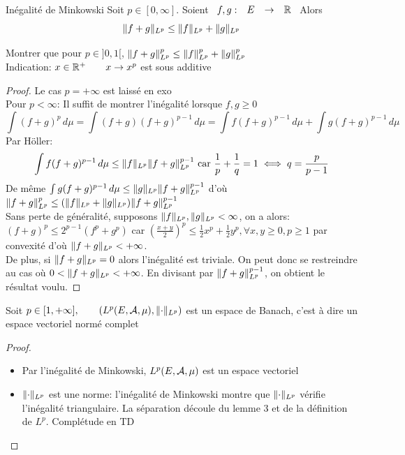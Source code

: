 \documentclass[]{report}
\begin{document}
    \begin{prop}{Inégalité de Minkowski}{}
        Soit $p\in[0,\infty]$. Soient $\begin{array}{ccccc} f,g : & E & \to & \mathbb{R} \end{array}$ Alors
        \[\lVert f+g \rVert_{L^p}\le \lVert f \rVert_{L^p}+\lVert g \rVert_{L^p}\]
    \end{prop}

    \begin{exo}{}{}
        Montrer que pour $p\in]0,1[$, $\lVert f+g \rVert_{L^p}^p\le \lVert f \rVert_{L^p}^p+\lVert g \rVert_{L^p}^p$\\
        Indication: $x\in \mathbb{R}^+\qquad x\to x^p$ est sous additive
    \end{exo}

    \begin{proof}
        Le cas $p=+\infty$ est laissé en exo\\
        Pour $p<\infty$: Il suffit de montrer l'inégalité lorsque $f,g\ge 0$
        \[\int (f+g)^p\,d\mu=\int (f+g)(f+g)^{p-1}\,d\mu=\int f(f+g)^{p-1}\,d\mu+ \int g(f+g)^{p-1}\,d\mu\]
        Par Höller:\[\int f(f+g)^{p-1}\,d\mu\le \lVert f \rVert_{L^p}\lVert f+g \rVert_{L^p}^{p-1}\text{ car }\frac{1}{p}+\frac{1}{q}=1\iff q=\frac{p}{p-1}\]
        De même $\int g(f+g)^{p-1}\,d\mu\le \lVert g \rVert_{L^p}\lVert f+g \rVert_{L^p}^{p-1}$ d'où $\lVert f+g \rVert_{L^p}^p\le (\lVert f \rVert_{L^p}+\lVert g \rVert_{L^p})\lVert f+g \rVert_{L^p}^{p-1}$\\
        Sans perte de généralité, supposons $\lVert f \rVert_{L^p},\lVert g \rVert_{L^p}<\infty$, on a alors: $(f+g)^p\le 2^{p-1}(f^p+g^p)$ car $(\frac{x+y}{2})^p\le \frac{1}{2}x^p+\frac{1}{2}y^p,\forall x,y\ge 0,p\ge 1$ par convexité d'où $\lVert f+g \rVert_{L^p}<+\infty$.\\
        De plus, si $\lVert f+g \rVert_{L^p}=0$ alors l'inégalité est triviale. On peut donc se restreindre au cas où $0<\lVert f+g \rVert_{L^p}<+\infty$. En divisant par $\lVert f+g \rVert_{L^p}^{p-1}$, on obtient le résultat voulu.
    \end{proof}

    \begin{tm}{}{}
        Soit $p\in [1,+\infty],\qquad (L^p(E,\mathcal{A},\mu),\lVert \cdot \rVert_{L^p})$ est un espace de Banach, c'est à dire un espace vectoriel normé complet
    \end{tm}

    \begin{proof}
        \begin{itemize}
            \item Par l'inégalité de Minkowski, $L^p(E,\mathcal{A},\mu)$ est un espace vectoriel
            \item $\lVert \cdot \rVert_{L^p}$ est une norme: l'inégalité de Minkowski montre que $\lVert \cdot \rVert_{L^p}$ vérifie l'inégalité triangulaire. La séparation découle du lemme 3 et de la définition de $L^p$. Complétude en TD
        \end{itemize}
    \end{proof}
\end{document}
